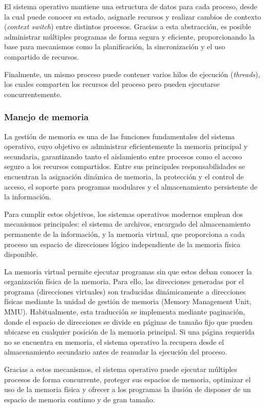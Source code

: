 El sistema operativo mantiene una estructura de datos para cada proceso, desde la cual puede conocer su estado, asignarle recursos y realizar cambios de contexto (\emph{context switch}) entre distintos procesos. Gracias a esta abstracción, es posible administrar múltiples programas de forma segura y eficiente, proporcionando la base para mecanismos como la planificación, la sincronización y el uso compartido de recursos.

Finalmente, un mismo proceso puede contener varios hilos de ejecución (\emph{threads}), los cuales comparten los recursos del proceso pero pueden ejecutarse concurrentemente.

\subsubsection{Manejo de memoria}

La gestión de memoria es una de las funciones fundamentales del sistema operativo, cuyo objetivo es administrar eficientemente la memoria principal y secundaria, garantizando tanto el aislamiento entre procesos como el acceso seguro a los recursos compartidos. Entre sus principales responsabilidades se encuentran la asignación dinámica de memoria, la protección y el control de acceso, el soporte para programas modulares y el almacenamiento persistente de la información.

Para cumplir estos objetivos, los sistemas operativos modernos emplean dos mecanismos principales: el sistema de archivos, encargado del almacenamiento permanente de la información, y la memoria virtual, que proporciona a cada proceso un espacio de direcciones lógico independiente de la memoria física disponible.

La memoria virtual permite ejecutar programas sin que estos deban conocer la organización física de la memoria. Para ello, las direcciones generadas por el programa (direcciones virtuales) son traducidas dinámicamente a direcciones físicas mediante la unidad de gestión de memoria (Memory Management Unit, MMU). Habitualmente, esta traducción se implementa mediante paginación, donde el espacio de direcciones se divide en páginas de tamaño fijo que pueden ubicarse en cualquier posición de la memoria principal. Si una página requerida no se encuentra en memoria, el sistema operativo la recupera desde el almacenamiento secundario antes de reanudar la ejecución del proceso.

Gracias a estos mecanismos, el sistema operativo puede ejecutar múltiples procesos de forma concurrente, proteger sus espacios de memoria, optimizar el uso de la memoria física y ofrecer a los programas la ilusión de disponer de un espacio de memoria continuo y de gran tamaño.

